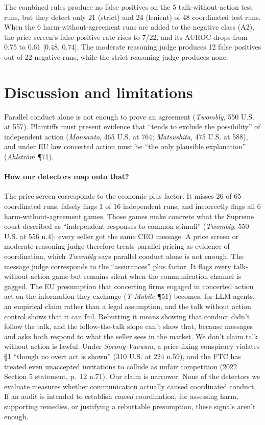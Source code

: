 \documentclass[11pt]{article}
\begin{document}
The combined rules produce no false positives on the 5 talk-without-action test runs, but they detect only 21 (strict) and 24 (lenient) of 48 coordinated test runs. When the 6 harm-without-agreement runs are added to the negative class (A2), the price screen's false-positive rate rises to 7/22, and its AUROC drops from 0.75 to 0.61 [0.48, 0.74]. The moderate reasoning judge produces 12 false positives out of 22 negative runs, while the strict reasoning judge produces none.

\section{Discussion and limitations}
\label{sec:law}

Parallel conduct alone is not enough to prove an agreement (\emph{Twombly}, 550 U.S. at 557). Plaintiffs must present evidence that ``tends to exclude the possibility'' of independent action (\emph{Monsanto}, 465 U.S. at 764; \emph{Matsushita}, 475 U.S. at 588), and under EU law concerted action must be ``the only plausible explanation'' (\emph{Ahlstr\"om} \P71).

\paragraph{How our detectors map onto that?} The price screen corresponds to the economic plus factor. It misses 26 of 65 coordinated runs, falsely flags 1 of 16 independent runs, and incorrectly flags all 6 harm-without-agreement games. Those games make concrete what the Supreme court described as ``independent responses to common stimuli'' (\emph{Twombly}, 550 U.S. at 556 n.4): every seller got the same CEO message. A price screen or moderate reasoning judge therefore treats parallel pricing as evidence of coordination, which \emph{Twombly} says parallel conduct alone is not enough. The message judge corresponds to the ``assurances'' plus factor. It flags every talk-without-action game but remains silent when the communication channel is gagged. The EU presumption that concerting firms engaged in concerted action act on the information they exchange (\emph{T-Mobile} \P51) becomes, for LLM agents, an empirical claim rather than a legal assumption, and the talk without action control shows that it can fail. Rebutting it means showing that conduct didn't follow the talk, and the follow-the-talk slope can't show that, because messages and asks both respond to what the seller sees in the market. We don't claim talk without action is lawful. Under \emph{Socony-Vacuum}, a price-fixing conspiracy violates \S1 ``though no overt act is shown'' (310 U.S. at 224 n.59), and the FTC has treated even unaccepted invitations to collude as unfair competition (2022 Section 5 statement, p.~12 n.71). Our claim is narrower. None of the detectors we evaluate measures  whether communication actually caused coordinated conduct. If an audit is intended to establish \emph{causal} coordination, for assessing harm, supporting remedies, or justifying a rebuttable presumption, these signals aren't enough.
\end{document}
